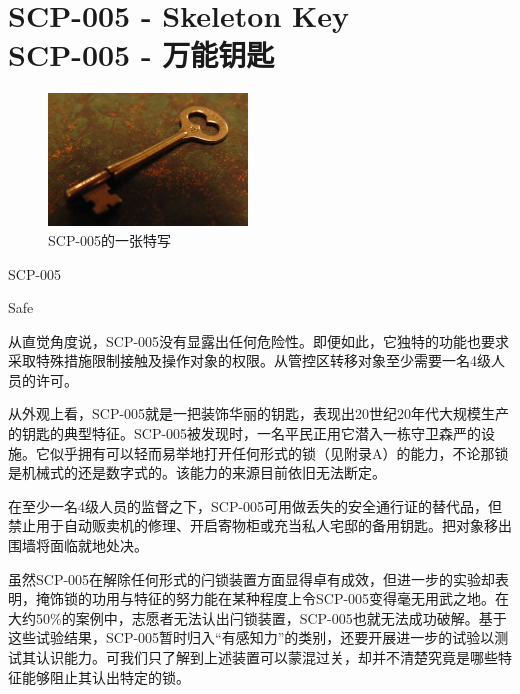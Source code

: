 \chapter[SCP-005 万能钥匙]{
	SCP-005 - Skeleton Key\\
	SCP-005 - 万能钥匙
}

\label{chap:SCP-005}

\begin{figure}[H]
	\centering
	\includegraphics[width=0.5\linewidth]{images/SCP.005.jpg}
	\caption*{SCP-005的一张特写}
\end{figure}

SCP-005

Safe

从直觉角度说，SCP-005没有显露出任何危险性。即便如此，它独特的功能也要求采取特殊措施限制接触及操作对象的权限。从管控区转移对象至少需要一名4级人员的许可。

从外观上看，SCP-005就是一把装饰华丽的钥匙，表现出20世纪20年代大规模生产的钥匙的典型特征。SCP-005被发现时，一名平民正用它潜入一栋守卫森严的设施。它似乎拥有可以轻而易举地打开任何形式的锁（见附录A）的能力，不论那锁是机械式的还是数字式的。该能力的来源目前依旧无法断定。

在至少一名4级人员的监督之下，SCP-005可用做丢失的安全通行证的替代品，但禁止用于自动贩卖机的修理、开启寄物柜或充当私人宅邸的备用钥匙。把对象移出围墙将面临就地处决。

虽然SCP-005在解除任何形式的闩锁装置方面显得卓有成效，但进一步的实验却表明，掩饰锁的功用与特征的努力能在某种程度上令SCP-005变得毫无用武之地。在大约50\%的案例中，志愿者无法认出闩锁装置，SCP-005也就无法成功破解。基于这些试验结果，SCP-005暂时归入“有感知力”的类别，还要开展进一步的试验以测试其认识能力。可我们只了解到上述装置可以蒙混过关，却并不清楚究竟是哪些特征能够阻止其认出特定的锁。
